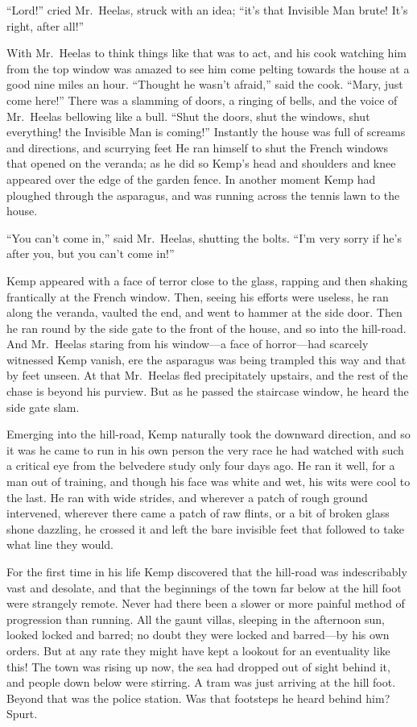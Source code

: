 “Lord!” cried Mr.\ Heelas, struck with an idea; “it’s that Invisible Man brute! It’s right, after all!”

With Mr.\ Heelas to think things like that was to act, and his cook watching him from the top window was amazed to see him come pelting towards the house at a good nine miles an hour. “Thought he wasn’t afraid,” said the cook. “Mary, just come here!” There was a slamming of doors, a ringing of bells, and the voice of Mr.\ Heelas bellowing like a bull. “Shut the doors, shut the windows, shut everything! the Invisible Man is coming!” Instantly the house was full of screams and directions, and scurrying feet He ran himself to shut the French windows that opened on the veranda; as he did so Kemp’s head and shoulders and knee appeared over the edge of the garden fence. In another moment Kemp had ploughed through the asparagus, and was running across the tennis lawn to the house.

“You can’t come in,” said Mr.\ Heelas, shutting the bolts. “I’m very sorry if he’s after you, but you can’t come in!”

Kemp appeared with a face of terror close to the glass, rapping and then shaking frantically at the French window. Then, seeing his efforts were useless, he ran along the veranda, vaulted the end, and went to hammer at the side door. Then he ran round by the side gate to the front of the house, and so into the hill-road. And Mr.\ Heelas staring from his window—a face of horror—had scarcely witnessed Kemp vanish, ere the asparagus was being trampled this way and that by feet unseen. At that Mr.\ Heelas fled precipitately upstairs, and the rest of the chase is beyond his purview. But as he passed the staircase window, he heard the side gate slam.

Emerging into the hill-road, Kemp naturally took the downward direction, and so it was he came to run in his own person the very race he had watched with such a critical eye from the belvedere study only four days ago. He ran it well, for a man out of training, and though his face was white and wet, his wits were cool to the last. He ran with wide strides, and wherever a patch of rough ground intervened, wherever there came a patch of raw flints, or a bit of broken glass shone dazzling, he crossed it and left the bare invisible feet that followed to take what line they would.

For the first time in his life Kemp discovered that the hill-road was indescribably vast and desolate, and that the beginnings of the town far below at the hill foot were strangely remote. Never had there been a slower or more painful method of progression than running. All the gaunt villas, sleeping in the afternoon sun, looked locked and barred; no doubt they were locked and barred—by his own orders. But at any rate they might have kept a lookout for an eventuality like this! The town was rising up now, the sea had dropped out of sight behind it, and people down below were stirring. A tram was just arriving at the hill foot. Beyond that was the police station. Was that footsteps he heard behind him? Spurt.

